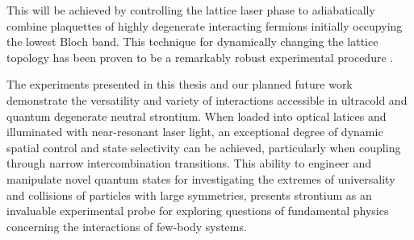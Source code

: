 This will be achieved by controlling the lattice laser phase to adiabatically combine plaquettes of highly degenerate interacting fermions initially occupying the lowest Bloch band.
This technique for dynamically changing the lattice topology has been proven to be a remarkably robust experimental procedure \cite{wse13, saj06, alb07, woh10, guj13}.

The experiments presented in this thesis and our planned future work demonstrate the versatility and variety of interactions accessible in ultracold and quantum degenerate neutral strontium.
When loaded into optical latices and illuminated with near-resonant laser light, an exceptional degree of dynamic spatial control and state selectivity can be achieved, particularly when coupling through narrow intercombination transitions.
This ability to engineer and manipulate novel quantum states for investigating the extremes of universality and collisions of particles with large symmetries, presents strontium as an invaluable experimental probe for exploring questions of fundamental physics concerning the interactions of few-body systems.



%



